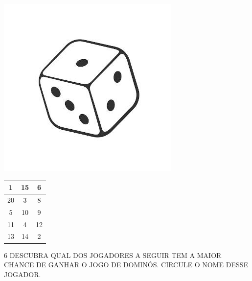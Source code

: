 \begin{minipage}{.5\textwidth}
\includegraphics[width=\textwidth]{media/image86.jpg}
\end{minipage}
\begin{minipage}{.5\textwidth}
\LARGE
\begin{tabular}{|c|c|c|}
\hline
1 & 15 & 6 \\ \hline
20 & 3 & 8 \\ \hline
5 & 10 & 9 \\ \hline
11 & 4 & 12 \\ \hline
13 & 14 & 2 \\ \hline
\end{tabular}
\end{minipage}


\pagebreak
\num{6} DESCUBRA QUAL DOS JOGADORES A SEGUIR TEM A MAIOR CHANCE DE GANHAR O JOGO
DE DOMINÓS. CIRCULE O NOME DESSE JOGADOR.


